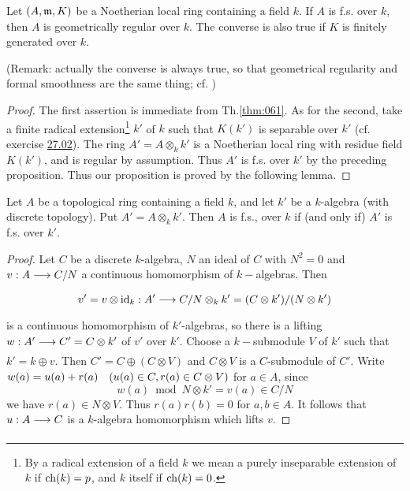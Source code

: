 \documentclass[../main]{subfiles}
\begin{document}
\begin{proposition}
Let $(A, \mathfrak{m}, K)$ be a Noetherian local ring containing a field $k$. If $A$ is f.s. over $k$, then $A$ is geometrically regular over $k$. The converse is also true if $K$ is finitely generated over $k$.

(Remark: actually the converse is always true, so that geometrical regularity and formal smoothness are the same thing; cf. \cite[22.5.8]{egaIV})
\end{proposition}

\begin{proof}
The first assertion is immediate from Th.\ref{thm:061}. As for the second, take a finite radical extension\footnote{By a radical extension of a field $k$ we mean a purely inseparable extension of $k$ if $\operatorname{ch}(k)=p$, and $k$ itself if $\operatorname{ch}(k)=0$.} $k'$ of $k$ such that $K(k')$ is separable over $k'$ (cf. exercise \hyperref[exe:27.02]{27.02}). The ring $A'=A \otimes_k k'$ is a Noetherian local ring with residue field $K(k')$, and is regular by assumption. Thus $A'$ is f.s. over $k'$ by the preceding proposition. Thus our proposition is proved by the following lemma.
\end{proof}

\begin{parlemma}\label{lem:28.01}
Let $A$ be a topological ring containing a field $k$, and let $k'$ be a $k$-algebra (with discrete topology). Put $A'=A \otimes_k k'$. Then $A$ is f.s., over $k$ if (and only if) $A'$ is f.s. over $k'$.
\end{parlemma}
\begin{proof} 
Let $C$ be a discrete $k$-algebra, $N$ an ideal of $C$ with $N^2=0$ and $v: A \varrightarrow{} C / N$ a continuous homomorphism of $k-$algebras. Then \[v'=v \otimes\id_k: A' \varrightarrow{} C / N \otimes_k k'=(C \otimes k') /(N \otimes k')\] is a continuous homomorphism of $k'$-algebras, so there is a lifting \newline $w:A' \varrightarrow{} C'=C \otimes k'$ of $v'$ over $k'$. Choose a $k-$submodule $V$ of $k'$ such that $k'=k \oplus v$. Then $C'=C \oplus(C \otimes V)$ and $C \otimes V$ is a $C$-submodule of $C'$. Write $w(a)=u(a)+r(a)\for{u(a) \in C, r(a) \in C \otimes V}$ for $a \in A$, since \[w(a) \bmod N \otimes k'=v(a) \in C / N\] we have $r(a) \in N \otimes V$. Thus $r(a) r(b)=0$ for $a, b \in A$. It follows that $u: A \varrightarrow{} C$ is a $k$-algebra homomorphism which lifts $v$.
\end{proof}
\end{document}
